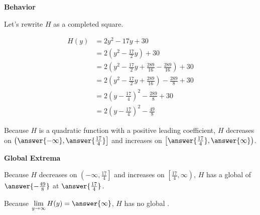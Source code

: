 \documentclass{ximera}
\begin{document}
\begin{exercise}
\begin{question}
\end{question}




\begin{question}  \textbf{\textcolor{blue!55!black}{Behavior}}

Let's rewrite $H$ as a completed square.


\begin{align*}
H(y) & = 2y^2 - 17y + 30 \\
& = 2 (y^2 - \frac{17}{2} y) + 30  \\
& = 2 (y^2 - \frac{17}{2} y + \frac{289}{16} - \frac{289}{16}) + 30 \\
& = 2 (y^2 - \frac{17}{2} y + \frac{289}{16}) - \frac{289}{8} + 30 \\
& = 2 (y - \frac{17}{4})^2 - \frac{289}{8} + 30 \\
& = 2 (y - \frac{17}{4})^2 - \frac{49}{8}
\end{align*}








Because $H$ is a quadratic function with a positive leading coefficient, $H$ decreases on $\left( \answer{-\infty}, \answer{\frac{17}{4}} \right]$ and increases on $\left[ \answer{\frac{17}{4}}, \answer{\infty} \right)$. 

\end{question}









\begin{question}  \textbf{\textcolor{blue!55!black}{Global Extrema}}

Because $H$ decreases on $\left( -\infty, \frac{17}{4} \right]$ and increases on $\left[ \frac{17}{4}, \infty \right)$, $H$ has a global   of $\answer{-\frac{49}{8}}$ at $\answer{\frac{17}{4}}$.



Because $\lim\limits_{y \to \infty} H(y) = \answer{\infty}$, $H$ has no global .

\end{question}













\end{exercise}
\end{document}
